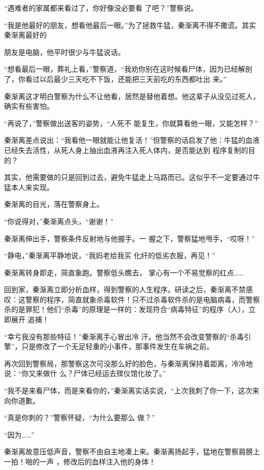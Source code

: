 \documentclass{article}
\begin{document}
“遇难者的家属都来看过了，你好像没必要看
了吧？”警察说。 

“我是他最好的朋友，想看他最后一眼。”为了拯救牛猛，秦渐离不得不撒谎。其实秦渐离最好的
\newpage

朋友是电脑，他平时很少与牛猛说话。 

“想看最后一眼，葬礼上看，”警察道，“我劝你别在这时候看尸体，因为已经解剖了，你看过以后最少三天吃不下饭，还能把三天前吃的东西都吐出
来。” 

秦渐离这才明白警察为什么不让他看，居然是替他着想。他这辈子从没见过死人，确实有些害怕。

“再说了，”警察做出送客的姿势，“人死不
能复生，你就算看他一眼，又能怎样？” 

秦渐离差点说出：“我看他一眼就能让他复活！”但警察的话启发了他：牛猛的血液已经失去活性，从死人身上抽出血液再注入死人体内，是否能达到
程序复制的目的？ 

其实，他需要做的只是回到过去，避免牛猛走上马路而已。这似乎不一定要通过牛猛本人来实现。

\newpage


秦渐离的目光，落在警察身上。 


“你说得对，”秦渐离点头，“谢谢！” 

秦渐离伸出手，警察条件反射地与他握手。一
握之下，警察猛地甩手，“哎呀！” 

“静电，”秦渐离平静地说，“我妈老给我买
化纤的低劣衣服，再见！” 

秦渐离转身即走，简直象跑。警察低头瞧去，
掌心有一个不易觉察的红点…… 

回到家，秦渐离立即分析血样，得到警察的人生程序。研读之后，秦渐离不禁感叹：这警察的程序，简直就象杀毒软件！只不过杀毒软件杀的是电脑病毒，而警察杀的是罪犯！他们“杀毒”的原理是一样的：发现符合“病毒特征”的程序（人），立即展开
追捕！ 

“幸亏我没有那些特征！”秦渐离手心冒出冷
\newpage
汗。他当然不会改变警察的“杀毒引擎”，只是修改了一个无足轻重的小事件，那事件发生在车祸之前。

再次回到警察局，那警察这次可没那么好的脸色，与秦渐离保持着距离，冷冷地说：“你又来做什
么？尸体已经运去殡仪馆化妆了。” 

“我不是来看尸体，而是来看你的，”秦渐离实话实说，“上次我刺了你一下，这次来向你道歉。

“真是你刺的？”警察怀疑，“为什么要那么
做？” 


“因为……” 

秦渐离故意压低声音，警察不由自主地凑上来。秦渐离扬起手，猛地在警察肩膀上一拍！啪的一声
，修改后的血样注入他的身体！ 
\end{document}
